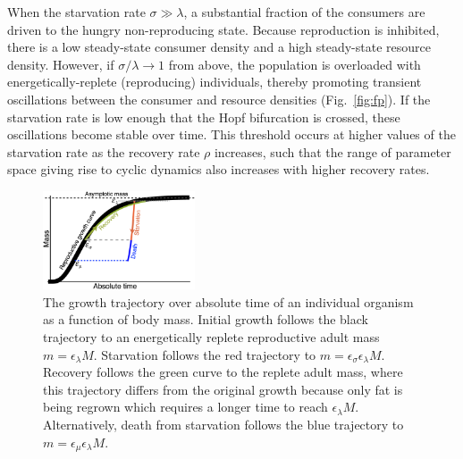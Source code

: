 \documentclass{pnastwo}
\begin{document}
\begin{article}
When the starvation rate $\sigma\gg\lambda$, a substantial fraction of the consumers are driven to the hungry non-reproducing state.
Because reproduction is inhibited, there is a low steady-state consumer density and a high steady-state resource density.
However, if $\sigma/\lambda\to 1$ from above, the population is overloaded with energetically-replete (reproducing) individuals, thereby promoting transient oscillations between the consumer and resource densities (Fig.~\ref{fig:fp}).
If the starvation rate is low enough that the Hopf bifurcation is crossed, these oscillations become stable over time.
This threshold occurs at higher values of the starvation rate as the recovery rate $\rho$ increases, such that the range of parameter space giving rise to cyclic dynamics also increases with higher recovery rates.
\\

\begin{figure}
\centering
\includegraphics[width=0.4\textwidth]{Growth-trajectory-diagram.eps}
\caption{\small{ The growth trajectory over absolute time of an individual organism as a function of body mass.  
Initial growth follows the black trajectory to an energetically replete reproductive adult mass $m=\epsilon_\lambda M$. %
Starvation follows the red trajectory to $m = \epsilon_\sigma \epsilon_\lambda  M$. 
Recovery follows the green curve to the replete adult mass, where this trajectory differs from the original growth because only fat is being regrown which requires a longer time to reach $\epsilon_\lambda M$. %
Alternatively, death from starvation follows the blue trajectory to $m=\epsilon_\mu \epsilon_\lambda  M$.}\label{fig:growth}}
\end{figure}


\end{article}
\end{document}

